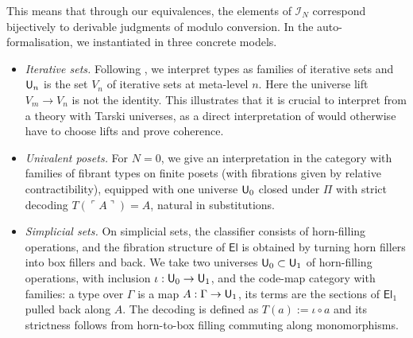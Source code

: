 This means that through our equivalences, the elements of $\mathcal{I}_N$ correspond bijectively to derivable judgments of \ThyPTS{} modulo conversion. In the auto-formalisation, we instantiated  in three concrete models.
\begin{itemize}
    \item \emph{Iterative sets.} Following \cite{Gylterud2018, aczel}, we interpret types as families of iterative sets and $\mathsf{U}_n$ is the set $V_n$ of iterative sets at meta-level $n$. Here the universe lift $V_m \to V_n$ is not the identity. This illustrates that it is crucial to interpret from a theory with Tarski universes, as a direct interpretation of \ThyPTS{} would otherwise have to choose lifts and prove coherence.
    \item \emph{Univalent posets.} For $N=0$, we give an interpretation in the category with families of fibrant types on finite posets \cite{Coquand2026Unit} (with fibrations given by relative contractibility), equipped with one universe $\mathsf{U}_0$ closed under $\Pi$ with strict decoding $T(\ulcorner A \urcorner) = A$, natural in substitutions.
    \item \emph{Simplicial sets.} On simplicial sets, the classifier consists of horn-filling operations, and the fibration structure of $\mathsf{El}$ is obtained by turning horn fillers into box fillers and back. We take two universes $\mathsf{U}_0 \subset \mathsf{U}_1$ of horn-filling operations, with inclusion $\iota : \mathsf{U}_0 \rightarrow \mathsf{U}_1$, and the code-map category with families: a type over $\Gamma$ is a map $A : \Gamma \rightarrow \mathsf{U}_1$, its terms are the sections of $\mathsf{El}_1$ pulled back along $A$. The decoding is defined as $T(a) := \iota \circ a$ and its strictness follows from horn-to-box filling commuting along monomorphisms.
\end{itemize}
